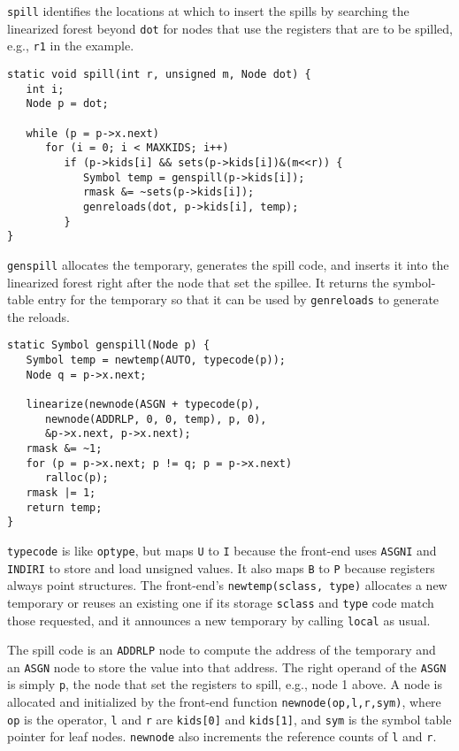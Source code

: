\verb|spill| identifies the locations at which
to insert the spills by searching the linearized forest beyond \verb|dot|
for nodes that use the registers that are to be spilled, e.g.,
\verb|r1| in the example.
\begin{verbatim}
static void spill(int r, unsigned m, Node dot) {
   int i;
   Node p = dot;

   while (p = p->x.next)
      for (i = 0; i < MAXKIDS; i++)
         if (p->kids[i] && sets(p->kids[i])&(m<<r)) {
            Symbol temp = genspill(p->kids[i]);
            rmask &= ~sets(p->kids[i]);
            genreloads(dot, p->kids[i], temp);
         }
}
\end{verbatim}
\verb|genspill| allocates the temporary,
generates the spill code, and inserts it into the linearized forest
right after the node that set the spillee.
It returns the symbol-table entry for the temporary
so that it can be used by \verb|genreloads| to generate the reloads.
\begin{verbatim}
static Symbol genspill(Node p) {
   Symbol temp = newtemp(AUTO, typecode(p));
   Node q = p->x.next;

   linearize(newnode(ASGN + typecode(p),
      newnode(ADDRLP, 0, 0, temp), p, 0),
      &p->x.next, p->x.next);
   rmask &= ~1;
   for (p = p->x.next; p != q; p = p->x.next)
      ralloc(p);
   rmask |= 1;
   return temp;
}
\end{verbatim}
\verb|typecode| is like \verb|optype|, but maps \verb|U| to \verb|I|
because the front-end uses \verb|ASGNI| and \verb|INDIRI|
to store and load unsigned values. It also maps \verb|B| to
\verb|P| because registers always point structures.
The front-end's \verb|newtemp(sclass, type)|
allocates a new temporary or reuses an existing one if
its storage \verb|sclass| and \verb|type| code match those requested,
and it announces a new temporary by calling \verb|local| as usual.

The spill code is an \verb|ADDRLP| node to compute the
address of the temporary and an \verb|ASGN| node to store the value
into that address. The right operand of the \verb|ASGN| is simply
\verb|p|, the node that set the registers to spill, e.g.,
node 1 above.
A node is allocated and initialized by the front-end function
\verb|newnode(op,l,r,sym)|, where
\verb|op| is the operator, \verb|l| and \verb|r|
are \verb|kids[0]| and \verb|kids[1]|, and \verb|sym| is the symbol
table pointer for leaf nodes. \verb|newnode| also increments
the reference counts of \verb|l| and \verb|r|.

